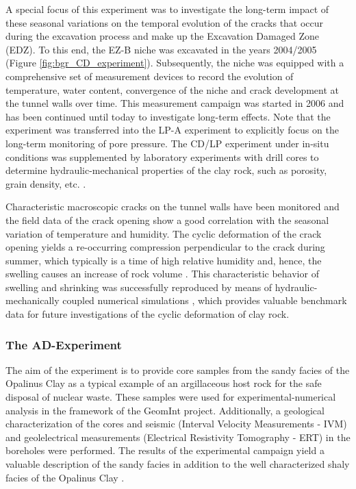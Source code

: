 A special focus of this experiment was to investigate the long-term impact of these seasonal variations on the temporal evolution of the cracks that occur during the excavation process and make up the Excavation Damaged Zone (EDZ). To this end, the EZ-B niche was excavated in the years 2004/2005 (Figure \ref{fig:bgr_CD_experiment}). Subsequently, the niche was equipped with a comprehensive set of measurement devices to record the evolution of temperature, water content, convergence of the niche and crack development at the tunnel walls over time. This measurement campaign was started in 2006 and has been continued until today to investigate long-term effects. Note that the experiment was transferred into the LP-A experiment to explicitly focus on the long-term monitoring of pore pressure. The CD/LP experiment under in-situ conditions was supplemented by laboratory experiments with drill cores to determine hydraulic-mechanical properties of the clay rock, such as porosity, grain density, etc. \cite{matray2013}. 

Characteristic macroscopic cracks on the tunnel walls have been monitored and the field data of the crack opening show a good correlation with the seasonal variation of temperature and humidity. The cyclic deformation of the crack opening yields a re-occurring compression perpendicular to the crack during summer, which typically is a time of high relative humidity and, hence, the swelling causes an increase of rock volume \cite{jaeggi2012}. This characteristic behavior of swelling and shrinking was successfully reproduced by means of hydraulic-mechanically coupled numerical simulations \cite{ziefle2018}, which provides valuable benchmark data for future investigations of the cyclic deformation of clay rock.

\subsubsection{The AD-Experiment}

The aim of the experiment is to provide core samples from the sandy facies of the Opalinus Clay as a typical example of an argillaceous host rock for the safe disposal of nuclear waste. These samples were used for experimental-numerical analysis in the framework of the GeomInt project. Additionally, a geological characterization of the cores and seismic (Interval Velocity Measurements - IVM) and geolelectrical measurements (Electrical Resistivity Tomography - ERT) in the boreholes were performed. The results of the experimental campaign yield a valuable description of the sandy facies in addition to the well characterized shaly facies of the Opalinus Clay \cite{bossart2008,jahn2016}. 

